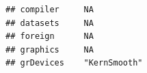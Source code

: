 \documentclass[]{article}
\begin{document}
\begin{verbatim}
## compiler     NA                                                                                                                                                                                                                                                                                                                                                                                                                                                                                                                                                                                        
## datasets     NA                                                                                                                                                                                                                                                                                                                                                                                                                                                                                                                                                                                        
## foreign      NA                                                                                                                                                                                                                                                                                                                                                                                                                                                                                                                                                                                        
## graphics     NA                                                                                                                                                                                                                                                                                                                                                                                                                                                                                                                                                                                        
## grDevices    "KernSmooth"                                                                                                                                                                                                                                                                                                                                                                                                                                                                                                                                                                              

\end{verbatim}
\end{document}
